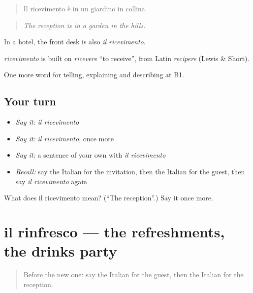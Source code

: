 \begin{quote}
Il ricevimento è in un giardino in collina.
\end{quote}

\begin{quote}
\emph{The reception is in a garden in the hills.}
\end{quote}

In a hotel, the front desk is also \emph{il ricevimento}.

\begin{cousinweb}
\emph{ricevimento} is built on \emph{ricevere} \textquotedblleft{}to receive\textquotedblright{}, from Latin \emph{recipere} (Lewis \& Short).
\end{cousinweb}

\begin{grammarlens}[title={What you've built}]
One more word for telling, explaining and describing at B1.
\end{grammarlens}

\subsection*{Your turn}
\begin{itemize}
\raggedright
  \item \emph{Say it:} \emph{il ricevimento}
  \item \emph{Say it:} \emph{il ricevimento}, once more
  \item \emph{Say it:} a sentence of your own with \emph{il ricevimento}
  \item \emph{Recall:} say the Italian for the invitation, then the Italian for the guest, then say \emph{il ricevimento} again
\end{itemize}

\begin{tcolorbox}[breakable,colback=teal!4,colframe=teal!35!black,title={Before you move on}]
What does il ricevimento mean? (\textquotedblleft{}The reception\textquotedblright{}.) Say it once more.
\end{tcolorbox}
\section[il rinfresco]{il rinfresco — the refreshments, the drinks party}

\label{lesson:IT-C318-rinfresco}



\begin{quote}
Before the new one: say the Italian for the guest, then the Italian for the reception.
\end{quote}

